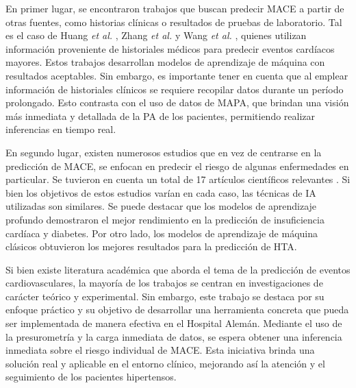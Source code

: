En primer lugar, se encontraron trabajos que buscan predecir MACE a partir de otras fuentes, como historias clínicas 
o resultados de pruebas de laboratorio. Tal es el caso de Huang \emph{et al.} \citep{CITE:11}, Zhang \emph{et al.} \citep{CITE:12} y 
Wang \emph{et al.} \citep{CITE:13}, quienes utilizan información proveniente de historiales médicos para predecir eventos 
cardíacos mayores. Estos trabajos desarrollan modelos de aprendizaje de máquina con resultados aceptables. 
Sin embargo, es importante tener en cuenta que 
al emplear información de historiales clínicos se requiere recopilar datos durante un período prolongado. 
Esto contrasta con el uso de datos de MAPA, que brindan una visión más inmediata y detallada de la PA de los pacientes, 
permitiendo realizar inferencias en tiempo real.

En segundo lugar, existen numerosos estudios que en vez de centrarse en la predicción de MACE, se enfocan en 
predecir el riesgo de algunas enfermedades en particular. Se tuvieron en cuenta un total de 17 artículos científicos 
relevantes \citep{CITE:14} \citep{CITE:15} \citep{CITE:16} \citep{CITE:17} \citep{CITE:18}
\citep{CITE:19} \citep{CITE:20} \citep{CITE:21} \citep{CITE:22} \citep{CITE:23} \citep{CITE:24}
\citep{CITE:25} \citep{CITE:26} \citep{CITE:27} \citep{CITE:28} \citep{CITE:29} \citep{CITE:30} \citep{CITE:31}.  
Si bien los objetivos de estos estudios varían en cada caso, las técnicas de IA utilizadas son similares. 
Se puede destacar que los modelos de aprendizaje profundo demostraron el mejor rendimiento en la predicción de 
insuficiencia cardíaca y diabetes. Por otro lado, los modelos de aprendizaje de máquina clásicos obtuvieron 
los mejores resultados para la predicción de HTA.

Si bien existe literatura académica que aborda el tema de la predicción de eventos cardiovasculares, 
la mayoría de los trabajos se centran en investigaciones de carácter teórico y experimental. Sin embargo, este trabajo 
se destaca por su enfoque práctico y su objetivo de desarrollar una herramienta concreta que pueda ser implementada 
de manera efectiva en el Hospital Alemán. Mediante el uso de la presurometría  y la carga inmediata de datos, se espera 
obtener una inferencia inmediata sobre el riesgo individual de MACE. Esta iniciativa brinda una solución real y 
aplicable en el entorno clínico, mejorando así la atención y el seguimiento de los pacientes hipertensos.